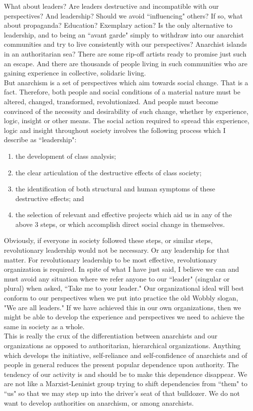 What about leaders? Are leaders destructive and incompatible with our perspectives? And leadership? Should we avoid ``influencing" others? If so, what about propaganda? Education? Exemplary action? Is the only alternative to leadership, and to being an ``avant garde" simply to withdraw into our anarchist communities and try to live consistently with our perspectives? Anarchist islands in an authoritarian sea? There are some rip-off artists ready to promise just such an escape. And there are thousands of people living in such communities who are gaining experience in collective, solidaric living.\\
But anarchism is a set of perspectives which aim towards social change. That is a fact. Therefore, both people and social conditions of a material nature must be altered, changed, transformed, revolutionized. And people must become convinced of the necessity and desirability of such change, whether by experience, logic, insight or other means. The social action required to spread this experience, logic and insight throughout society involves the following process which I describe as ``leadership":
\begin{enumerate}
\item the development of class analysis;
\item the clear articulation of the destructive effects of class society;
\item the identification of both structural and human symptoms of these destructive effects; and
\item the selection of relevant and effective projects which aid us in any of the above 3 steps, or which accomplish direct social change in themselves.
\end{enumerate}
Obviously, if everyone in society followed these steps, or similar steps, revolutionary leadership would not be necessary. Or any leadership for that matter. For revolutionary leadership to be most effective, revolutionary organization is required. In spite of what I have just said, I believe we can and must avoid any situation where we refer anyone to our ``leader" (singular or plural) when asked, ``Take me to your leader." Our organizational ideal will best conform to our perspectives when we put into practice the old Wobbly slogan, "We are all leaders." If we have achieved this in our own organizations, then we might be able to develop the experience and perspectives we need to achieve the same in society as a whole.\\
This is really the crux of the differentiation between anarchists and our organizations as opposed to authoritarian, hierarchical organizations. Anything which develops the initiative, self-reliance and self-confidence of anarchists and of people in general reduces the present popular dependence upon authority. The tendency of our activity is and should be to make this dependence disappear. We are not like a Marxist-Leninist group trying to shift dependencies from ``them" to ``us" so that we may step up into the driver's seat of that bulldozer. We do not want to develop authorities on anarchism, or among anarchists.\\
